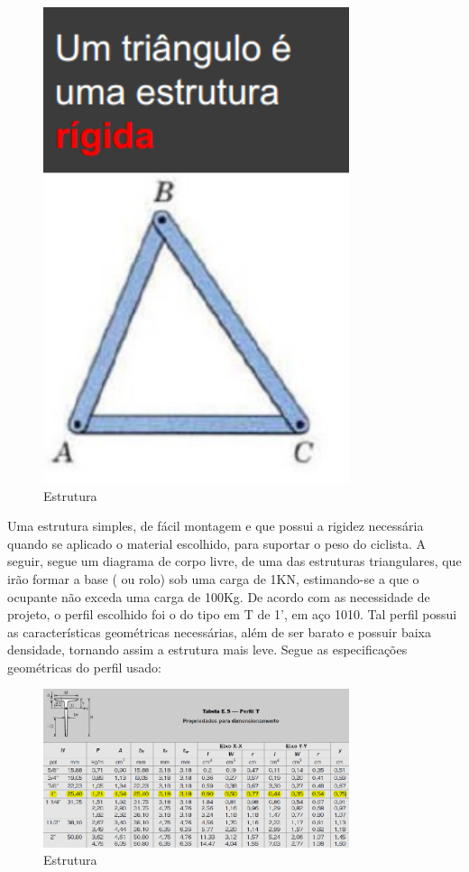 \begin{figure}[h]
    \centering
    \includegraphics[width=0.8\textwidth]{figuras/trelica.png}
    \caption{Estrutura}
    \label{fig:trelica}
\end{figure}

Uma estrutura simples, de fácil montagem e que possui a rigidez necessária quando se aplicado o material escolhido, para suportar o peso do ciclista. A seguir, segue um diagrama de corpo livre, de uma das estruturas triangulares, que irão formar a base ( ou rolo) sob uma carga de 1KN, estimando-se a que o ocupante não exceda uma carga de 100Kg.
De acordo com as necessidade de projeto, o perfil escolhido foi o do tipo em T de 1’, em aço 1010. Tal perfil possui as características geométricas necessárias, além de ser barato e possuir baixa densidade, tornando assim a estrutura mais leve. Segue as especificações geométricas do perfil usado:

\begin{figure}[h]
    \centering
    \includegraphics[width=0.8\textwidth]{figuras/perfil_t.png}
    \caption{Estrutura}
    \label{fig:awesome_image}
\end{figure}

